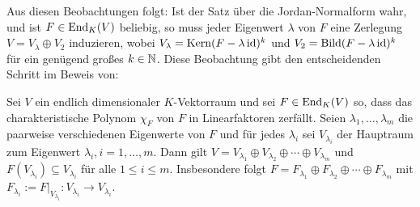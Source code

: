 Aus diesen Beobachtungen folgt:
Ist der Satz über die Jordan-Normalform wahr, und ist $F \in \operatorname{End}_K(V)$ beliebig, so muss jeder Eigenwert $\lambda$ von $F$ eine Zerlegung $V = V_\lambda \oplus V_2$ induzieren, wobei $V_\lambda = \operatorname{Kern}(F - \lambda \operatorname{id})^k$ und $V_2 = \operatorname{Bild}(F - \lambda \operatorname{id})^k$ für ein genügend großes $k \in \mathbb{N}$.
Diese Beobachtung gibt den entscheidenden Schritt im Beweis von:

\begin{satz}
	\label{satz:9.15}
	Sei $V$ ein endlich dimensionaler $K$-Vektorraum und sei $F \in \operatorname{End}_K(V)$ so, dass das charakteristische Polynom $\chi_F$ von $F$ in Linearfaktoren zerfällt.
	Seien $\lambda_1,\dots,\lambda_m$ die paarweise verschiedenen Eigenwerte von $F$ und für jedes $\lambda_i$ sei $V_{\lambda_i}$ der Hauptraum zum Eigenwert $\lambda_i, i = 1, \dots, m$.
	Dann gilt $V = V_{\lambda_1} \oplus V_{\lambda_2} \oplus \cdots \oplus V_{\lambda_m}$ und $F(V_{\lambda_i}) \subseteq V_{\lambda_i}$ für alle $1 \leq i \leq m$.
	Insbesondere folgt $F = F_{\lambda_1} \oplus F_{\lambda_2} \oplus \cdots \oplus F_{\lambda_m}$ mit $F_{\lambda_i} := F\big|_{V_{\lambda_i}} \colon V_{\lambda_i} \rightarrow V_{\lambda_i}$.
\end{satz}

